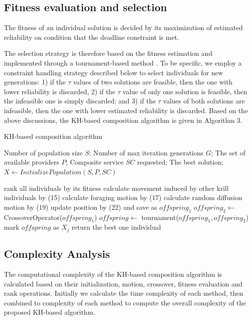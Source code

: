 \documentclass[journal]{IEEEtran}
\begin{document}
\subsection{Fitness evaluation and selection}
The fitness of an individual solution is decided by its maximization of estimated reliability on condition that the deadline constraint is met.

The selection strategy is therefore based on the fitness estimation and implemented through a tournament-based method \cite{whitley1994genetic}. To be specific, we employ a constraint handling strategy described below to select individuals for new generations: 1) if the $\tau$ values of two solutions are feasible, then the one with lower reliability is discarded, 2) if the $\tau$ value of only one solution is feasible, then the infeasible one is simply discarded; and 3) if the $\tau$ values of both solutions are infeasible, then the one with lower estimated reliability is discarded.
Based on the above discussions, the KH-based composition algorithm is given in Algorithm 3.

\begin{algorithm}
\caption{KH-based composition algorithm}
\label{KH}
\begin{algorithmic}[1]

\REQUIRE Number of population size $S$; Number of max iteration generations $G$; The set of available providers $P$;  Composite service $SC$ requested;
\ENSURE The best solution;
\STATE $X \leftarrow InitializePopulation(S,P,SC)$

  \STATE rank all individuals by its fitness
    \STATE calculate movement induced by other krill individuals by (15)
    \STATE calculate foraging motion by (17)
    \STATE calculate random diffusion motion by (19)
    \STATE update position by (22) and save as $offspring_1$
    \STATE $offspring_2 \leftarrow $ CrossoverOperator($offspring_1$)
    \STATE $offspring \leftarrow $ tournament($offspring_1, offspring_2$)
    \STATE mark $offspring$ as $X_j$
  \ENDFOR
\ENDFOR
\STATE return the best one individual
\end{algorithmic}
\end{algorithm}

\subsection{Complexity Analysis}
The computational complexity of the KH-based composition algorithm is calculated based on their initialization, motion, crossover, fitness evaluation and rank operations. 
Initially we calculate the time complexity of each method, then combined to complexity of each method to compute the overall complexity of the proposed KH-based algorithm.
\end{document}
